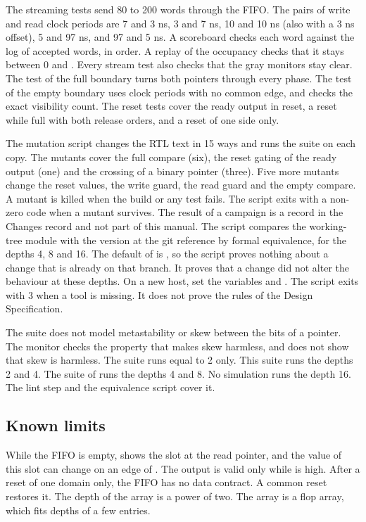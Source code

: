 The streaming tests send 80 to 200 words through the FIFO. The pairs of write and read clock periods are 7 and 3 ns, 3 and 7 ns, 10 and 10 ns (also with a 3 ns offset), 5 and 97 ns, and 97 and 5 ns. A scoreboard checks each word against the log of accepted words, in order. A replay of the occupancy checks that it stays between 0 and . Every stream test also checks that the gray monitors stay clear. The test of the full boundary turns both pointers through every phase. The test of the empty boundary uses clock periods with no common edge, and checks the exact visibility count. The reset tests cover the ready output in reset, a reset while full with both release orders, and a reset of one side only.

The mutation script  changes the RTL text in 15 ways and runs the suite on each copy. The mutants cover the full compare (six), the reset gating of the ready output (one) and the crossing of a binary pointer (three). Five more mutants change the reset values, the write guard, the read guard and the empty compare. A mutant is killed when the build or any test fails. The script exits with a non-zero code when a mutant survives. The result of a campaign is a record in the Changes record and not part of this manual. The script  compares the working-tree module with the version at the git reference  by formal equivalence, for the depths 4, 8 and 16. The default of  is , so the script proves nothing about a change that is already on that branch. It proves that a change did not alter the behaviour at these depths. On a new host, set the variables  and . The script exits with 3 when a tool is missing. It does not prove the rules of the Design Specification.

The suite does not model metastability or skew between the bits of a pointer. The monitor checks the property that makes skew harmless, and does not show that skew is harmless. The suite runs  equal to 2 only. This suite runs the depths 2 and 4. The suite of  runs the depths 4 and 8. No simulation runs the depth 16. The lint step and the equivalence script cover it.

\subsection{Known limits}
While the FIFO is empty,  shows the slot at the read pointer, and the value of this slot can change on an edge of . The output is valid only while  is high. After a reset of one domain only, the FIFO has no data contract. A common reset restores it. The depth of the array is a power of two. The array is a flop array, which fits depths of a few entries.

